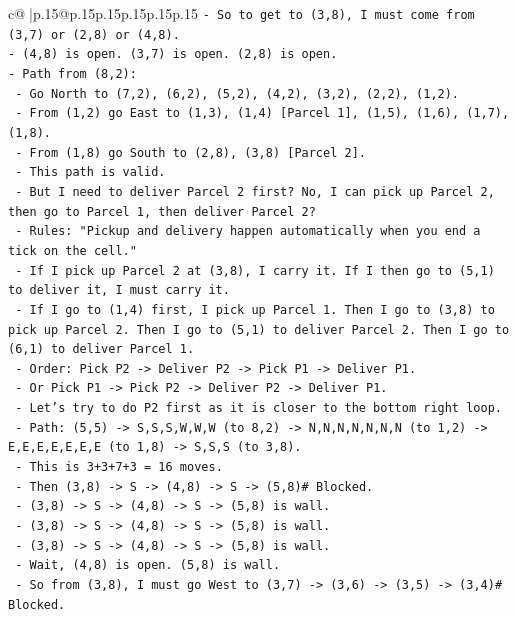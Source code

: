 \documentclass{article}
\begin{document}
{\begin{supertabular}{c@{$\;$}|p{.15\linewidth}@{}p{.15\linewidth}p{.15\linewidth}p{.15\linewidth}p{.15\linewidth}p{.15\linewidth}}
{{{\texttt{{-} So to get to (3,8), I must come from (3,7) or (2,8) or (4,8).} \\
\texttt{{-} (4,8) is open. (3,7) is open. (2,8) is open.} \\
\texttt{{-} Path from (8,2):} \\
\texttt{  {-} Go North to (7,2), (6,2), (5,2), (4,2), (3,2), (2,2), (1,2).} \\
\texttt{  {-} From (1,2) go East to (1,3), (1,4) {[}Parcel 1{]}, (1,5), (1,6), (1,7), (1,8).} \\
\texttt{  {-} From (1,8) go South to (2,8), (3,8) {[}Parcel 2{]}.} \\
\texttt{  {-} This path is valid.} \\
\texttt{  {-} But I need to deliver Parcel 2 first? No, I can pick up Parcel 2, then go to Parcel 1, then deliver Parcel 2?} \\
\texttt{  {-} Rules: "Pickup and delivery happen automatically when you end a tick on the cell."} \\
\texttt{  {-} If I pick up Parcel 2 at (3,8), I carry it. If I then go to (5,1) to deliver it, I must carry it.} \\
\texttt{  {-} If I go to (1,4) first, I pick up Parcel 1. Then I go to (3,8) to pick up Parcel 2. Then I go to (5,1) to deliver Parcel 2. Then I go to (6,1) to deliver Parcel 1.} \\
\texttt{  {-} Order: Pick P2 {-}> Deliver P2 {-}> Pick P1 {-}> Deliver P1.} \\
\texttt{  {-} Or Pick P1 {-}> Pick P2 {-}> Deliver P2 {-}> Deliver P1.} \\
\texttt{  {-} Let's try to do P2 first as it is closer to the bottom right loop.} \\
\texttt{  {-} Path: (5,5) {-}> S,S,S,W,W,W (to 8,2) {-}> N,N,N,N,N,N,N (to 1,2) {-}> E,E,E,E,E,E,E (to 1,8) {-}> S,S,S (to 3,8).} \\
\texttt{  {-} This is 3+3+7+3 = 16 moves.} \\
\texttt{  {-} Then (3,8) {-}> S {-}> (4,8) {-}> S {-}> (5,8)\# Blocked.} \\
\texttt{  {-} (3,8) {-}> S {-}> (4,8) {-}> S {-}> (5,8) is wall.} \\
\texttt{  {-} (3,8) {-}> S {-}> (4,8) {-}> S {-}> (5,8) is wall.} \\
\texttt{  {-} (3,8) {-}> S {-}> (4,8) {-}> S {-}> (5,8) is wall.} \\
\texttt{  {-} Wait, (4,8) is open. (5,8) is wall.} \\
\texttt{  {-} So from (3,8), I must go West to (3,7) {-}> (3,6) {-}> (3,5) {-}> (3,4)\# Blocked.} \\
}}}
\end{supertabular}}
\end{document}
